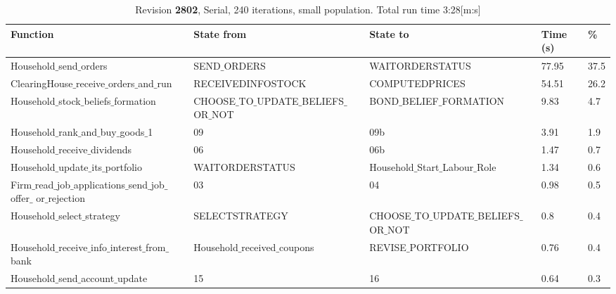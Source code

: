 \begin{landscape}
\begin{table}
\begin{tabular}{|l|l|l|l|l|}\hline
Function & State from & State to & Time (s) & \% \\ \hline
Household$\_$send$\_$orders & SEND$\_$ORDERS & WAITORDERSTATUS &  77.95 & 37.5 \\ \hline
ClearingHouse$\_$receive$\_$orders$\_$and$\_$run & RECEIVEDINFOSTOCK & COMPUTEDPRICES &   54.51 & 26.2 \\ \hline
Household$\_$stock$\_$beliefs$\_$formation & CHOOSE$\_$TO$\_$UPDATE$\_$BELIEFS$\_$OR$\_$NOT & BOND$\_$BELIEF$\_$FORMATION &   9.83 & 4.7 \\ \hline
Household$\_$rank$\_$and$\_$buy$\_$goods$\_$1 & 09 & 09b &   3.91 & 1.9 \\ \hline
Household$\_$receive$\_$dividends & 06 & 06b &   1.47 & 0.7 \\ \hline
Household$\_$update$\_$its$\_$portfolio & WAITORDERSTATUS & Household$\_$Start$\_$Labour$\_$Role &   1.34 & 0.6 \\ \hline
\parbox[t]{7cm}{Firm$\_$read$\_$job$\_$applications$\_$send$\_$job$\_$offer$\_$\\[-4pt]or$\_$rejection} & 03 & 04 &   0.98 & 0.5 \\ \hline
Household$\_$select$\_$strategy & SELECTSTRATEGY & CHOOSE$\_$TO$\_$UPDATE$\_$BELIEFS$\_$OR$\_$NOT &   0.8 & 0.4 \\ \hline
Household$\_$receive$\_$info$\_$interest$\_$from$\_$bank & Household$\_$received$\_$coupons & REVISE$\_$PORTFOLIO &   0.76 & 0.4 \\ \hline
Household$\_$send$\_$account$\_$update & 15 & 16 &  0.64 & 0.3 \\ \hline
\end{tabular}
\caption{Revision \textbf{2802}, Serial, 240 iterations, small population. Total run time 3:28[m:s]}
\end{table}

\end{landscape}

